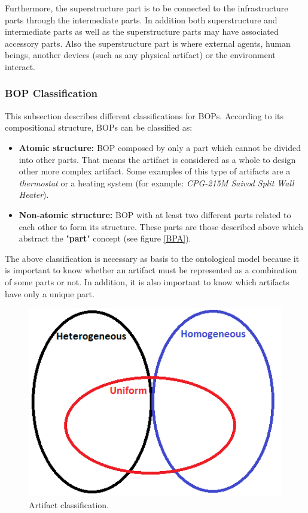 \documentclass[runningheads,a4paper]{llncs}
\begin{document}
Furthermore, the superstructure part is to be connected to the infrastructure parts through the intermediate parts. In addition both superstructure and intermediate parts as well as the superstructure parts may have associated accessory parts. Also the superstructure part is where external agents, human beings, another devices (such as any physical artifact) or the environment interact.

\subsubsection{BOP Classification}
This subsection describes different classifications for BOPs. According to its compositional structure, BOPs can be classified as: 
\begin{itemize}
  \item \textbf{Atomic structure:} BOP composed by only a part which cannot be divided into other parts. That means the artifact is considered as a whole to design other more complex artifact. Some examples of this type of artifacts are a \emph{thermostat} or a heating system (for example: \emph{CPG-215M Saivod Split Wall Heater}). 
  \item \textbf{Non-atomic structure:} BOP with at least two different parts related to each other to form its structure. These parts are those described above which abstract the "\textbf{part}" concept (see figure \ref{BPA}). 
\end{itemize}

The above classification is necessary as basis to the ontological model because it is important to know whether an artifact must be represented as a combination of some parts or not. In addition, it is also important to know which artifacts have only a unique part. 
\begin{figure}[h]
\centering
\includegraphics[scale=0.4]{Venn.png}
\caption{Artifact classification.}\label{Venn}
\end{figure}
\end{document}
